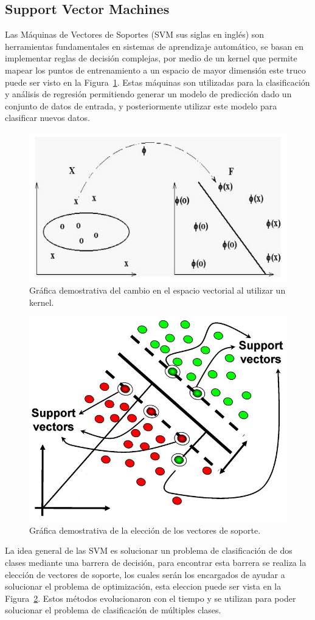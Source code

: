 	\subsection{Support Vector Machines}
	\label{sec:svm}
	Las Máquinas de Vectores de Soportes (SVM sus siglas en inglés) son herramientas fundamentales en sistemas de aprendizaje automático, se basan en  implementar reglas de decisión complejas, por medio de un kernel que permite mapear los puntos de entrenamiento a un espacio de mayor dimensión este truco puede ser visto en la Figura~\ref{art:fig:kernel_trick}. Estas máquinas son utilizadas para la clasificación y análisis de regresión permitiendo generar un modelo de predicción dado un conjunto de datos de entrada, y posteriormente utilizar este modelo para clasificar nuevos datos.
	
	\begin{figure}[tb]
		\centering
		\includegraphics[width=.5\textwidth]{Figuras/Diagramas/estado_del_arte/kernel_trick.jpg}
		\caption{Gráfica demostrativa del cambio en el espacio vectorial al utilizar un kernel.}
		\label{art:fig:kernel_trick}
	\end{figure}
	
	\begin{figure}[t]
		\centering
		\includegraphics[width=.5\textwidth]{Figuras/Diagramas/estado_del_arte/support_vectors.jpg}
		\caption{Gráfica demostrativa de la elección de los vectores de soporte.}
		\label{art:fig:support_vectors}
	\end{figure}
		
	La idea general de las SVM es solucionar un problema de clasificación de dos clases mediante una barrera de decisión, para encontrar esta barrera se realiza la elección de vectores de soporte, los cuales serán los encargados de ayudar a solucionar el problema de optimización, esta eleccion puede ser vista en la Figura~\ref{art:fig:support_vectors}. Estos métodos evolucionaron con el tiempo y se utilizan para poder solucionar el problema de clasificación de múltiples clases.

